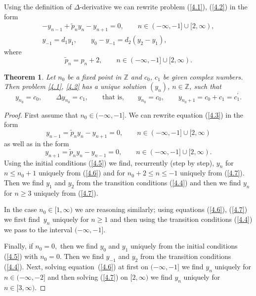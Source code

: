 \documentclass[11pt]{article}
\newtheorem{theorem}{Theorem}
\numberwithin{equation}{section}
\begin{document}
Using the def\/inition of $\Delta $-derivative we can rewrite problem (\ref{4.1}), (\ref{4.2}) in the form%
\begin{gather}
-y_{n-1}+\widetilde{p}_{n}y_{n}-y_{n+1}=0,\qquad n\in (-\infty ,-1]\cup
\lbrack 2,\infty ),  \label{4.3}
\\
y_{-1}=d_{1}y_{1},\qquad y_{0}-y_{-1}=d_{2}(y_{2}-y_{1}),  \label{4.4}
\end{gather}%
where%
\[
\widetilde{p}_{n}=p_{n}+2,\qquad n\in (-\infty ,-1]\cup \lbrack
2,\infty ).
\]

\begin{theorem}
\label{Th4.1}Let $n_{0}$ be a fixed point in $\mathbb{Z}$ and $c_{0}$, $c_{1}$ be given complex numbers. Then problem \eqref{4.1}, \eqref{4.2} has a unique solution $(y_{n})$, $n\in
\mathbb{Z}$, such that%
\begin{equation}
y_{n_{0}}=c_{0},\qquad \Delta y_{n_{0}}=c_{1},\qquad \text{that is,}\qquad
y_{n_{0}}=c_{0},\qquad y_{n_{0}+1}=c_{0}+c_{1}=c_{1}^{\prime }.
\label{4.5}
\end{equation}
\end{theorem}

\begin{proof}
First assume that $n_{0}\in (-\infty ,-1].$ We can rewrite equation (\ref{4.3}) in the form%
\begin{equation}
y_{n-1}=\widetilde{p}_{n}y_{n}-y_{n+1}=0,\qquad n\in (-\infty ,-1]\cup
\lbrack 2,\infty )  \label{4.6}
\end{equation}%
as well as in the form%
\begin{equation}
y_{n+1}=\widetilde{p}_{n}y_{n}-y_{n-1}=0,\qquad n\in (-\infty ,-1]\cup
\lbrack 2,\infty ).  \label{4.7}
\end{equation}%
Using the initial conditions (\ref{4.5}) we f\/ind, recurrently (step by
step), $y_{n}$ for $n\leq n_{0}+1$ uniquely from (\ref{4.6}) and for $%
n_{0}+2\leq n\leq -1$ uniquely from (\ref{4.7}). Then we f\/ind $y_{1}$ and $%
y_{2}$ from the transition conditions (\ref{4.4}) and then we f\/ind $y_{n}$
for $n\geq 3$ uniquely from (\ref{4.7}).

In the case $n_{0}\in \lbrack 1,\infty )$ we are reasoning similarly; using
equations (\ref{4.6}), (\ref{4.7}) we f\/irst f\/ind~$y_{n}$ uniquely for $n\geq
1$ and then using the transition conditions (\ref{4.4}) we pass to the
interval $(-\infty ,-1].$

Finally, if $n_{0}=0,$ then we f\/ind $y_{0}$ and $y_{1}$ uniquely from the
initial conditions (\ref{4.5}) with $n_{0}=0$. Then we f\/ind $y_{-1}$ and $%
y_{2}$ from the transition conditions (\ref{4.4}). Next, solving equation~(\ref{4.6}) at f\/irst on $(-\infty ,-1]$ we f\/ind $y_{n}$ uniquely for $n\in
(-\infty ,-2]$ and then solving (\ref{4.7}) on $[2,\infty )$ we f\/ind $y_{n}$
uniquely for $n\in \lbrack 3,\infty ).$
\end{proof}
\end{document}
